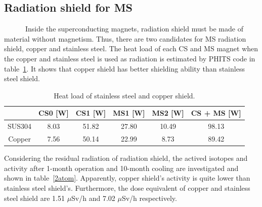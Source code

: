  \subsection{Radiation shield for MS}
~~~~~~Inside the superconducting magnets, radiation shield must be made of material without magnetism.
Thus, there are two candidates for MS radiation shield, copper and stainless steel.
The heat load of each CS and MS magnet when the copper and stainless steel is used as radiation is estimated by PHITS code in table~\ref{hrsload}.
It shows that copper shield has better shielding ability than stainless steel shield.
 \begin{table}[H]
 \centering
 \begin{tabular}{cccccc} \hline \hline
  & CS0 [W] & CS1 [W] & MS1 [W] & MS2 [W] & CS + MS [W] \\ \hline
  SUS304 & 8.03 & 51.82 & 27.80 & 10.49 & 98.13 \\
  Copper & 7.56 & 50.14 & 22.99 & 8.73 & 89.42 \\ \hline \hline
 \end{tabular}
 \caption{Heat load of stainless steel and copper shield.}
 \label{hrsload}
\end{table}
Considering the residual radiation of radiation shield, the actived isotopes and activity after 1-month operation and 10-month cooling are investigated and shown in table~\ref{2atom}.
Apparently, copper shield's activity is quite lower than stainless steel shield's.
Furthermore, the dose equivalent of copper and stainless steel shield are 1.51 $\mu$Sv/h and 7.02 $\mu$Sv/h respectively.

